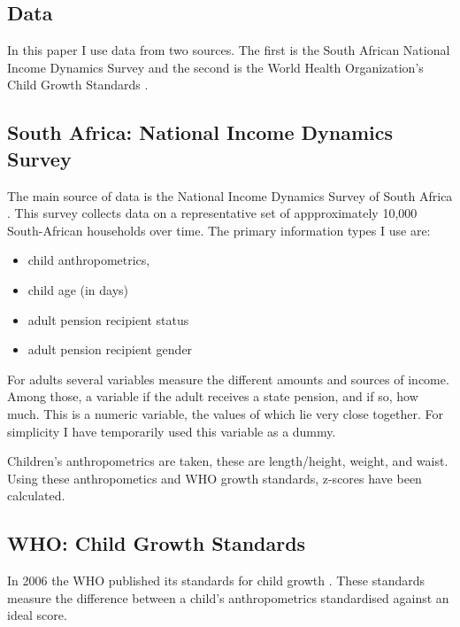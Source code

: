 \begin{refsection}



\section{Data}
\label{sa:data}
In this paper I use data from two sources.
The first is the South African National Income Dynamics Survey \parencite[NIDS][]{saldru2008nids, saldru2012nids, saldru2013nids} and the second is the World Health Organization's Child Growth Standards \parencite[WHO]{who2006child}.

\subsection{South Africa: National Income Dynamics Survey}
The main source of data is the National Income Dynamics Survey of South Africa \parencite{saldru2008nids, saldru2012nids, saldru2013nids}.
This survey collects data on a representative set of appproximately 10,000 South-African households over time.
The primary information types I use are:
\begin{itemize}
  \item child anthropometrics,
  \item child age (in days)
  \item adult pension recipient status
  \item adult pension recipient gender
\end{itemize}

For adults several variables measure the different amounts and sources of income.
Among those, a variable if the adult receives a state pension, and if so, how much.
This is a numeric variable, the values of which lie very close together.
For simplicity I have temporarily used this variable as a dummy.

Children's anthropometrics are taken, these are length/height, weight, and waist.
Using these anthropometics and WHO growth standards, z-scores have been calculated.

\subsection{WHO: Child Growth Standards}
In 2006 the WHO published its standards for child growth \parencite{who2006child}.
These standards measure the difference between a child's anthropometrics
standardised against an ideal score.


\end{refsection}
